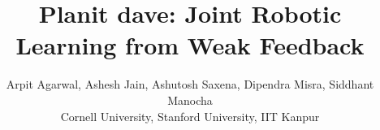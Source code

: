 \documentclass[letterpaper, 10 pt, conference]{ieeeconf}  %
\begin{document}
\title{Planit dave: Joint Robotic Learning from Weak Feedback}

\author{Arpit Agarwal, Ashesh Jain, Ashutosh Saxena, Dipendra Misra, Siddhant Manocha \\
Cornell University, Stanford University, IIT Kanpur\\}


\maketitle
\maketitle

\IEEEpeerreviewmaketitle




















{


}
\end{document}
